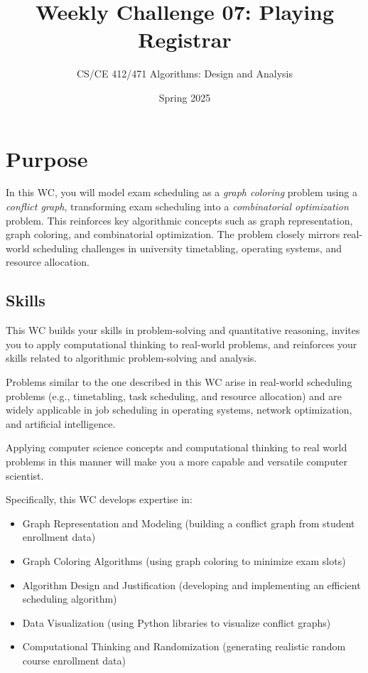 \documentclass[a4paper]{exam}
\title{Weekly Challenge 07: Playing Registrar}
\author{CS/CE 412/471 Algorithms: Design and Analysis}
\date{Spring 2025}
\begin{document}
\maketitle
\thispagestyle{empty}

\section*{Purpose}

In this WC, you will model exam scheduling as a \textit{graph coloring} problem using a \textit{conflict graph}, transforming exam scheduling into a \textit{combinatorial optimization} problem. This reinforces key algorithmic concepts such as graph representation, graph coloring, and combinatorial optimization. The problem closely mirrors real-world scheduling challenges in university timetabling, operating systems, and resource allocation.

\subsection*{Skills}

This WC builds your skills in problem-solving and quantitative reasoning, invites you to apply computational thinking to real-world problems, and reinforces your skills related to algorithmic problem-solving and analysis.

Problems similar to the one described in this WC arise in real-world scheduling problems (e.g., timetabling, task scheduling, and resource allocation) and are widely applicable in job scheduling in operating systems, network optimization, and artificial intelligence.

Applying computer science concepts and computational thinking to real world problems in this manner will make you a more capable and versatile computer scientist.

Specifically, this WC develops expertise in:
\begin{itemize}
\item Graph Representation and Modeling (building a conflict graph from student enrollment data)
\item Graph Coloring Algorithms (using graph coloring to minimize exam slots)
\item Algorithm Design and Justification (developing and implementing an efficient scheduling algorithm)
\item Data Visualization (using Python libraries to visualize conflict graphs)
\item Computational Thinking and Randomization (generating realistic random course enrollment data)
\end{itemize}
\end{document}
